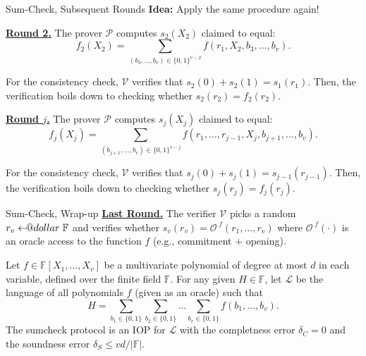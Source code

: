 \documentclass{zkdl-presentation-template}
\makeatletter
\newcommand\leftarrowS{\leftarrow\joinrel\smalldollar}
\newcommand{\smalldollar}{\mathrel{\mathpalette\small@dollar\relax}}
\newcommand{\small@dollar}[2]{%
  \vcenter{\hbox{%
    $#1\textnormal{\fontsize{0.7\dimexpr\f@size pt}{0}\selectfont\$}$%
  }}%
}
\makeatother
\begin{document}
    \begin{frame}{Sum-Check, Subsequent Rounds}
        \textbf{Idea:} Apply the same procedure again!\pause

        \underline{\textbf{Round 2.}} The prover $\mathcal{P}$ computes
        $s_2(X_2)$ claimed to equal:
        \begin{equation*}
            f_2(X_2) = \sum_{(b_3,\dots,b_v) \in \{0,1\}^{v-2}}f(r_1,X_2,b_3,\dots,b_v).
        \end{equation*}

        \pause For the consistency check, $\mathcal{V}$ verifies that $s_2(0) + s_2(1)
        = s_1(r_1)$. Then, the verification boils down to checking whether
        $s_2(r_2) = f_2(r_2)$. \pause

        \underline{\textbf{Round $j$.}} The prover $\mathcal{P}$ computes
        $s_j(X_j)$ claimed to equal:
        \begin{equation*}
            f_j(X_j) = \sum_{(b_{j+1},\dots,b_v) \in \{0,1\}^{v-j}}f(r_1,\dots,r_{j-1},X_j,b_{j+1},\dots,b_v).
        \end{equation*}

        \pause For the consistency check, $\mathcal{V}$ verifies that $s_j(0) + s_j(1)
        = s_{j-1}(r_{j-1})$. Then, the verification boils down to checking whether
        $s_j(r_j) = f_j(r_j)$.
    \end{frame}

    \begin{frame}{Sum-Check, Wrap-up}
        \underline{\textbf{Last Round.}} The verifier $\mathcal{V}$ picks a
        random $r_v \leftarrowS \mathbb{F}$ and verifies whether $s_v(r_v) =
        \mathcal{O}^{\; f}(r_1,\dots,r_v)$ where $\mathcal{O}^{\; f}(\cdot)$ is
        an oracle access to the function $f$ (e.g., commitment + opening).\pause

        \begin{lemma}
            Let $f \in \mathbb{F}[X_1,\dots,X_v]$ be a multivariate polynomial of degree
    at most $d$ in each variable, defined over the finite field $\mathbb{F}$.
    For any given $H \in \mathbb{F}$, let $\mathcal{L}$ be the language of 
    all polynomials $f$ (given as an oracle) such that
    \begin{equation*}
        H = \sum_{b_1 \in \{0,1\}}\sum_{b_2 \in \{0,1\}} \dots \sum_{b_v \in \{0,1\}} f(b_1,\dots,b_v).
    \end{equation*}
    The sumcheck protocol is an IOP for $\mathcal{L}$ with the completness error
    $\delta_C=0$ and the soundness error $\delta_S \leq vd/|\mathbb{F}|$.
        \end{lemma}
    \end{frame}
\end{document}

